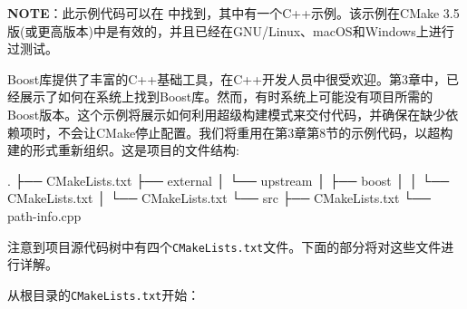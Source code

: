 \begin{myInfoBox}
\textbf{NOTE}：此示例代码可以在  中找到，其中有一个C++示例。该示例在CMake 3.5版(或更高版本)中是有效的，并且已经在GNU/Linux、macOS和Windows上进行过测试。
\end{myInfoBox}

Boost库提供了丰富的C++基础工具，在C++开发人员中很受欢迎。第3章中，已经展示了如何在系统上找到Boost库。然而，有时系统上可能没有项目所需的Boost版本。这个示例将展示如何利用超级构建模式来交付代码，并确保在缺少依赖项时，不会让CMake停止配置。我们将重用在第3章第8节的示例代码，以超构建的形式重新组织。这是项目的文件结构:

\begin{codebox}[shell]
.
├── CMakeLists.txt
├── external
│    └── upstream
│        ├── boost
│        │    └── CMakeLists.txt
│        └── CMakeLists.txt
└── src
    ├── CMakeLists.txt
    └── path-info.cpp
\end{codebox}

注意到项目源代码树中有四个\texttt{CMakeLists.txt}文件。下面的部分将对这些文件进行详解。


从根目录的\texttt{CMakeLists.txt}开始：

